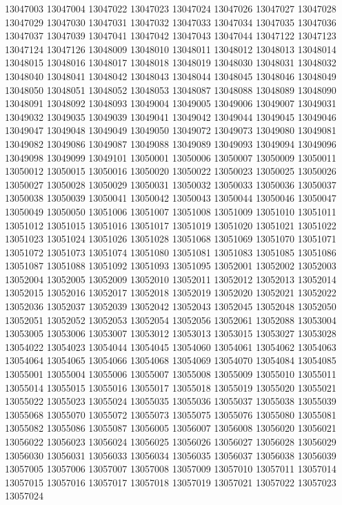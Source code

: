 13047003
13047004
13047022
13047023
13047024
13047026
13047027
13047028
13047029
13047030
13047031
13047032
13047033
13047034
13047035
13047036
13047037
13047039
13047041
13047042
13047043
13047044
13047122
13047123
13047124
13047126
13048009
13048010
13048011
13048012
13048013
13048014
13048015
13048016
13048017
13048018
13048019
13048030
13048031
13048032
13048040
13048041
13048042
13048043
13048044
13048045
13048046
13048049
13048050
13048051
13048052
13048053
13048087
13048088
13048089
13048090
13048091
13048092
13048093
13049004
13049005
13049006
13049007
13049031
13049032
13049035
13049039
13049041
13049042
13049044
13049045
13049046
13049047
13049048
13049049
13049050
13049072
13049073
13049080
13049081
13049082
13049086
13049087
13049088
13049089
13049093
13049094
13049096
13049098
13049099
13049101
13050001
13050006
13050007
13050009
13050011
13050012
13050015
13050016
13050020
13050022
13050023
13050025
13050026
13050027
13050028
13050029
13050031
13050032
13050033
13050036
13050037
13050038
13050039
13050041
13050042
13050043
13050044
13050046
13050047
13050049
13050050
13051006
13051007
13051008
13051009
13051010
13051011
13051012
13051015
13051016
13051017
13051019
13051020
13051021
13051022
13051023
13051024
13051026
13051028
13051068
13051069
13051070
13051071
13051072
13051073
13051074
13051080
13051081
13051083
13051085
13051086
13051087
13051088
13051092
13051093
13051095
13052001
13052002
13052003
13052004
13052005
13052009
13052010
13052011
13052012
13052013
13052014
13052015
13052016
13052017
13052018
13052019
13052020
13052021
13052022
13052036
13052037
13052039
13052042
13052043
13052045
13052048
13052050
13052051
13052052
13052053
13052054
13052056
13052061
13052088
13053004
13053005
13053006
13053007
13053012
13053013
13053015
13053027
13053028
13054022
13054023
13054044
13054045
13054060
13054061
13054062
13054063
13054064
13054065
13054066
13054068
13054069
13054070
13054084
13054085
13055001
13055004
13055006
13055007
13055008
13055009
13055010
13055011
13055014
13055015
13055016
13055017
13055018
13055019
13055020
13055021
13055022
13055023
13055024
13055035
13055036
13055037
13055038
13055039
13055068
13055070
13055072
13055073
13055075
13055076
13055080
13055081
13055082
13055086
13055087
13056005
13056007
13056008
13056020
13056021
13056022
13056023
13056024
13056025
13056026
13056027
13056028
13056029
13056030
13056031
13056033
13056034
13056035
13056037
13056038
13056039
13057005
13057006
13057007
13057008
13057009
13057010
13057011
13057014
13057015
13057016
13057017
13057018
13057019
13057021
13057022
13057023
13057024

